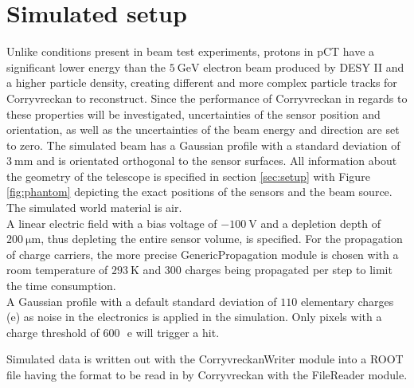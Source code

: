 \section{Simulated setup}
Unlike conditions present in beam test experiments, protons in pCT have a significant lower energy than the $\SI{5}{\giga\eV}$
electron beam produced by DESY II and a higher particle density, creating different and more complex particle tracks for
Corryvreckan to reconstruct. Since the performance of Corryvreckan in regards to these properties will be investigated, uncertainties
of the sensor position and orientation, as well as the uncertainties of the beam energy and direction are set to zero. The simulated
beam has a Gaussian profile with a standard deviation of $\SI{3}{\milli\meter}$ and is orientated orthogonal to the sensor
surfaces. All information about the geometry of the telescope is specified in section \ref{sec:setup} with
Figure \ref{fig:phantom} depicting the exact positions of the sensors and the beam source. The simulated world material is air.\\ %
A linear electric field with a bias voltage of $\SI{-100}{\volt}$ and a depletion depth of $\SI{200}{\micro\meter}$,
thus depleting the entire sensor volume, is specified. For the propagation of charge carriers, the more precise GenericPropagation
module is chosen with a room temperature of $\SI{293}{\kelvin}$ and 300 charges being propagated per step to limit the time consumption.\\
A Gaussian profile with a default standard deviation of $110$ elementary charges (e) as noise in the electronics is applied in the simulation.
Only pixels with a charge threshold of \mbox{$600$\, e} will trigger a hit.

Simulated data is written out with the CorryvreckanWriter module into a ROOT file having the format to be read
in by Corryvreckan with the FileReader module.

